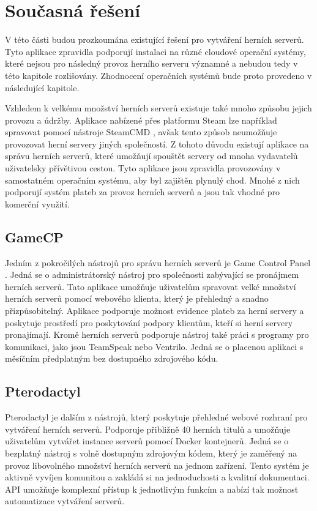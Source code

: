 \chapter[Současná řešení]{Současná řešení}

V této části budou prozkoumána existující řešení pro vytváření herních serverů. Tyto aplikace zpravidla podporují instalaci na různé cloudové operační systémy,
které nejsou pro následný provoz herního serveru významné a nebudou tedy v této kapitole rozlišovány. Zhodnocení operačních systémů bude proto provedeno v následující kapitole.

Vzhledem k velkému množství herních serverů existuje také mnoho způsobu jejich provozu a údržby. Aplikace nabízené přes platformu Steam
lze například spravovat pomocí nástroje SteamCMD \cite{steamcmd}, avšak tento způsob neumožňuje provozovat herní servery jiných společností.
Z tohoto důvodu existují aplikace na správu herních serverů, které umožňují spouštět servery od mnoha vydavatelů uživatelsky přívětivou cestou.
Tyto aplikace jsou zpravidla provozovány v samostatném operačním systému, aby byl zajištěn plynulý chod.
Mnohé z nich podporují systém plateb za provoz herních serverů a jsou tak vhodné pro komerční využití.

\section{GameCP}

Jedním z pokročilých nástrojů pro správu herních serverů je Game Control Panel \cite{gamecp}. Jedná se o administrátorský nástroj pro společnosti
zabývající se pronájmem herních serverů. Tato aplikace umožňuje uživatelům spravovat velké množství herních serverů pomocí webového klienta,
který je přehledný a snadno přizpůsobitelný. Aplikace podporuje možnost evidence plateb za herní servery a poskytuje prostředí pro poskytování
podpory klientům, kteří si herní servery pronajímají. Kromě herních serverů podporuje nástroj také práci s programy pro komunikaci, jako jsou TeamSpeak
nebo Ventrilo. Jedná se o placenou aplikaci s měsíčním předplatným bez dostupného zdrojového kódu.

\section{Pterodactyl}

Pterodactyl \cite{pterodactyl} je dalším z nástrojů, který poskytuje přehledné webové rozhraní pro vytváření herních serverů.
Podporuje přibližně 40 herních titulů a umožňuje uživatelům vytvářet instance serverů pomocí Docker kontejnerů. Jedná se o bezplatný nástroj
s volně dostupným zdrojovým kódem, který je zaměřený na provoz libovolného množství herních serverů na jednom zařízení. Tento systém je aktivně vyvíjen komunitou
a zakládá si na jednoduchosti a kvalitní dokumentaci. API umožňuje komplexní přístup k jednotlivým funkcím a nabízí tak možnost automatizace
vytváření serverů.

